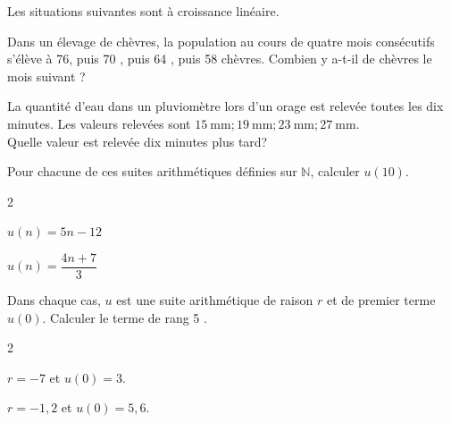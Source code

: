 \documentclass[11pt,a4paper]{article}  %
\begin{document}
	\graphicspath{{images/}}
	
	\begin{center}
		
		
	\end{center}



Les situations suivantes sont à croissance linéaire.
\begin{enumMet}
	\item Dans un élevage de chèvres, la population au cours de quatre mois consécutifs s'élève à 76, puis 70 , puis 64 , puis 58 chèvres.
	Combien y a-t-il de chèvres le mois suivant ?
	\item La quantité d'eau dans un pluviomètre lors d'un orage est relevée toutes les dix minutes. Les valeurs relevées sont $15 \mathrm{~mm} ; 19 \mathrm{~mm} ; 23 \mathrm{~mm} ; 27 \mathrm{~mm}$.\\
	Quelle valeur est relevée dix minutes plus tard?
\end{enumMet}

Pour chacune de ces suites arithmétiques définies sur $\mathbb{N}$, calculer $u(10)$.
\begin{multicols}{2}
	\begin{enumMet}
	\item $u(n)=5 n-12$
	\item $u(n)=\dfrac{4 n+7}{3}$
\end{enumMet}
\end{multicols}

Dans chaque cas, $u$ est une suite arithmétique de raison $r$ et de premier terme $u(0)$. Calculer le terme de rang 5 .
\begin{multicols}{2}
	\begin{enumMet}
		\item $r=-7$ et $u(0)=3$.
		\item $r=-1,2$ et $u(0)=5,6$.
	\end{enumMet}
\end{multicols}
\end{document}

